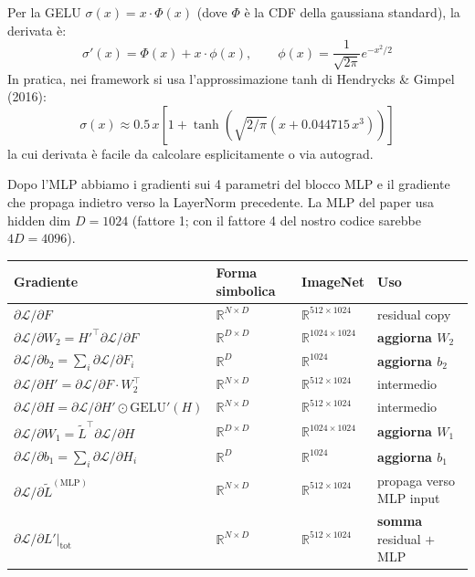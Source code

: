 \documentclass[
  11pt,
]{article}
\begin{document}
\begin{notabox}[title={\textbf{GELU backward --- formula esplicita}}]
Per la GELU $\sigma(x) = x \cdot \Phi(x)$ (dove $\Phi$ è la CDF della gaussiana standard), la derivata è:
\[
\sigma'(x) = \Phi(x) + x \cdot \phi(x), \qquad \phi(x) = \frac{1}{\sqrt{2\pi}} e^{-x^2/2}
\]
In pratica, nei framework si usa l'approssimazione tanh di Hendrycks \& Gimpel (2016):
\[
\sigma(x) \approx 0.5 \, x \left[1 + \tanh\!\left(\sqrt{2/\pi}(x + 0.044715\, x^3)\right)\right]
\]
la cui derivata è facile da calcolare esplicitamente o via autograd.
\end{notabox}

\begin{notabox}[title={\textbf{Checkpoint gradienti --- fine MLP backward}}]
Dopo l'MLP abbiamo i gradienti sui 4 parametri del blocco MLP e il gradiente che propaga indietro verso la LayerNorm precedente. La MLP del paper usa hidden dim $D = 1024$ (fattore 1; con il fattore 4 del nostro codice sarebbe $4D = 4096$).

\medskip
\begin{center}
{\small
\begin{tabular}{@{}llll@{}}
\toprule
\textbf{Gradiente} & \textbf{Forma simbolica} & \textbf{ImageNet} & \textbf{Uso} \\
\midrule
$\partial\mathcal{L}/\partial F$ & $\mathbb{R}^{N \times D}$ & $\mathbb{R}^{512 \times 1024}$ & residual copy \\
$\partial\mathcal{L}/\partial W_2 = {H'}^\top \partial\mathcal{L}/\partial F$ & $\mathbb{R}^{D \times D}$ & $\mathbb{R}^{1024 \times 1024}$ & \textbf{aggiorna $W_2$} \\
$\partial\mathcal{L}/\partial b_2 = \sum_i \partial\mathcal{L}/\partial F_i$ & $\mathbb{R}^{D}$ & $\mathbb{R}^{1024}$ & \textbf{aggiorna $b_2$} \\
$\partial\mathcal{L}/\partial H' = \partial\mathcal{L}/\partial F \cdot W_2^\top$ & $\mathbb{R}^{N \times D}$ & $\mathbb{R}^{512 \times 1024}$ & intermedio \\
$\partial\mathcal{L}/\partial H = \partial\mathcal{L}/\partial H' \odot \mathrm{GELU}'(H)$ & $\mathbb{R}^{N \times D}$ & $\mathbb{R}^{512 \times 1024}$ & intermedio \\
$\partial\mathcal{L}/\partial W_1 = \widetilde{L}^\top \partial\mathcal{L}/\partial H$ & $\mathbb{R}^{D \times D}$ & $\mathbb{R}^{1024 \times 1024}$ & \textbf{aggiorna $W_1$} \\
$\partial\mathcal{L}/\partial b_1 = \sum_i \partial\mathcal{L}/\partial H_i$ & $\mathbb{R}^{D}$ & $\mathbb{R}^{1024}$ & \textbf{aggiorna $b_1$} \\
$\partial\mathcal{L}/\partial \widetilde{L}^{(\text{MLP})}$ & $\mathbb{R}^{N \times D}$ & $\mathbb{R}^{512 \times 1024}$ & propaga verso MLP input \\
\midrule
$\left.\partial\mathcal{L}/\partial L'\right|_{\text{tot}}$ & $\mathbb{R}^{N \times D}$ & $\mathbb{R}^{512 \times 1024}$ & \textbf{somma} residual $+$ MLP \\
\bottomrule
\end{tabular}
}
\end{center}


\end{notabox}
\end{document}
